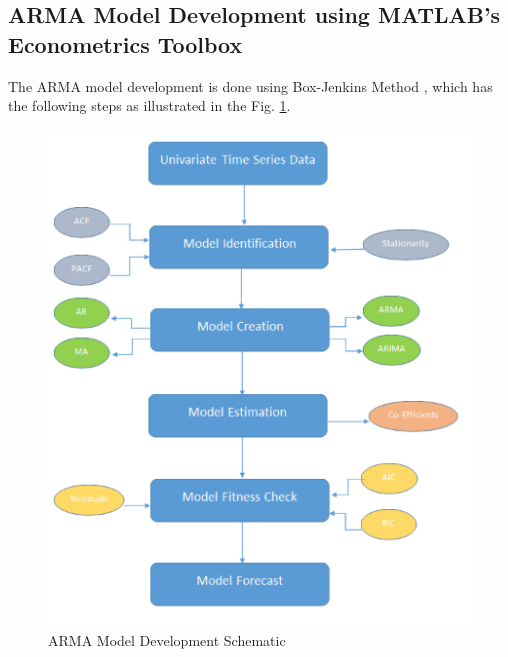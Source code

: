 \documentclass[journal]{IEEEtran}
\begin{document}
\subsection{ARMA Model Development using MATLAB’s Econometrics Toolbox}

The ARMA model development is done using Box-Jenkins Method \cite{box2015time}, which has the following steps as illustrated in the Fig. \ref{fig4}.


\begin{figure}[htpb]
\centering
\includegraphics[scale=0.75]{ARMASteps.png}
\caption{ARMA Model Development Schematic}
\label{fig4} %
\end{figure}
\end{document}
